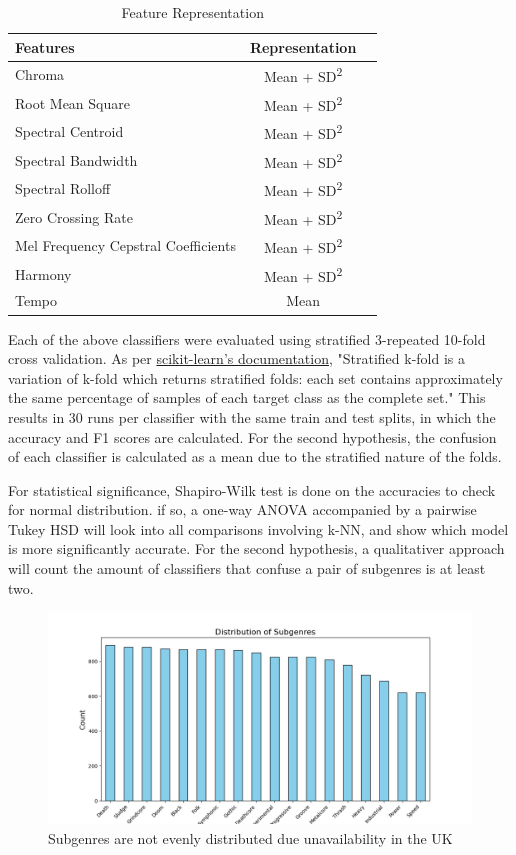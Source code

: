 \begin{table}[h!]
\centering
\begin{tabular}{|l|c|c|}
\hline
\textbf{Features} & \textbf{Representation} \\ \hline
Chroma                     & Mean + SD\textsuperscript{2}  \\ \hline
Root Mean Square           & Mean + SD\textsuperscript{2}  \\ \hline
Spectral Centroid          & Mean + SD\textsuperscript{2}  \\ \hline
Spectral Bandwidth         & Mean + SD\textsuperscript{2}  \\ \hline
Spectral Rolloff           & Mean + SD\textsuperscript{2}  \\ \hline
Zero Crossing Rate         & Mean + SD\textsuperscript{2} \\ \hline
Mel Frequency Cepstral Coefficients & Mean + SD\textsuperscript{2}\\ \hline
Harmony                    & Mean + SD\textsuperscript{2} \\ \hline
Tempo                      & Mean                         \\ \hline
\end{tabular}
\caption{Feature Representation}
\label{tab:feature_rep_dims}
\end{table}

Each of the above classifiers were evaluated using stratified 3-repeated 10-fold cross validation. As per \href{https://scikit-learn.org/dev/modules/cross_validation.html#stratified-k-fold}{scikit-learn's documentation}, "Stratified k-fold is a variation of k-fold which returns stratified folds: each set contains approximately the same percentage of samples of each target class as the complete set." This results in 30 runs per classifier with the same train and test splits, in which the accuracy and F1 scores are calculated. For the second hypothesis, the confusion of each classifier is calculated as a mean due to the stratified nature of the folds.

For statistical significance, Shapiro-Wilk test is done on the accuracies to check for normal distribution. if so, a one-way ANOVA accompanied by a pairwise Tukey HSD will look into all comparisons involving k-NN, and show which model is more significantly accurate. For the second hypothesis, a qualitativer approach will count the amount of classifiers that confuse a pair of subgenres is at least two.

\begin{figure}[h!]
    \centering
    \includegraphics[width=\textwidth]{figures/subgenre_distribution.png} 
    \caption{Subgenres are not evenly distributed due unavailability in the UK}
    \label{fig:dist}
\end{figure}

